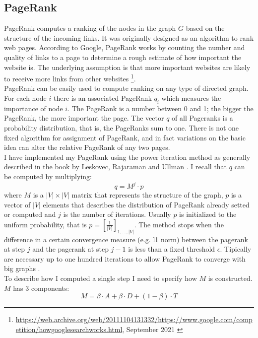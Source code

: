 \documentclass{article}
\begin{document}
\subsection{PageRank}
\label{pagerank}
PageRank computes a ranking of the nodes in the graph $G$ based on the structure of the incoming links. It was originally designed as an algorithm to rank web pages. According to Google, PageRank works by counting the number and quality of links to a page to determine a rough estimate of how important the website is. The underlying assumption is that more important websites are likely to receive more links from other websites \footnote{\url{https://web.archive.org/web/20111104131332/https://www.google.com/competition/howgooglesearchworks.html}, September 2021 \label{google}}. \\PageRank can be easily used to compute ranking on any type of directed graph. For each node $i$ there is an associated PageRank $q_{i}$ which measures the importance of node $i$. The PageRank is a number between 0 and 1; the bigger the PageRank, the more important the page. The vector $q$ of all Pageranks is a probability distribution, that is, the PageRanks sum to one. There is not one fixed algorithm for assignment of PageRank, and in fact variations on the basic idea can alter the relative PageRank of any two pages. \\
I have implemented my PageRank using the power iteration method as generally described in the book by Leskovec, Rajaraman and Ullman \cite{leskovec2014}. I recall that $q$ can be computed by multiplying:
\[ q = M^j \cdot p \]
where $M$ is a $|V| \times |V|$ matrix that represents the structure of the graph, $p$ is a vector of $|V|$ elements that describes the distribution of PageRank already setted or computed and $j$ is the number of iterations. Usually $p$ is initialized to the uniform probability, that is $p = [\frac{1}{|V|}]_{1,...,|V|}$. The method stops when the difference in a certain convergence measure (e.g. l1 norm) between the pagerank at step $j$ and the pagerank at step $j-1$ is less than a fixed threshold $\epsilon$. Tipically are necessary up to one hundred iterations to allow PageRank to converge with big graphs \cite{leskovec2014}. \\
To describe how I computed a single step I need to specify how $M$ is constructed. $M$ has 3 components:
\begin{equation}
\label{eq:M}
    M = \beta \cdot A + \beta \cdot D + (1 - \beta) \cdot T
\end{equation}
\end{document}
